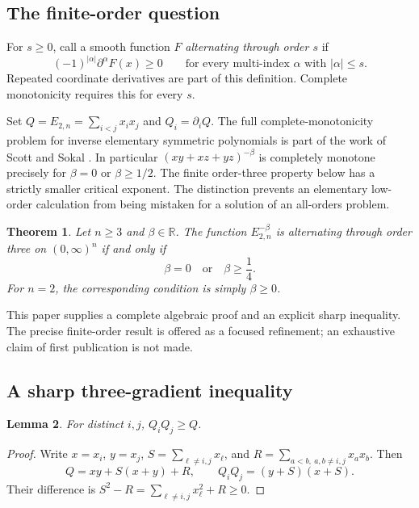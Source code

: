 \documentclass[11pt,a4paper]{article}
\newtheorem{theorem}{Theorem}[section]
\newtheorem{lemma}[theorem]{Lemma}
\theoremstyle{definition}\newtheorem{definition}[theorem]{Definition}
\theoremstyle{remark}\newtheorem{remark}[theorem]{Remark}
\newcommand{\R}{\mathbb R}\newcommand{\C}{\mathbb C}\newcommand{\N}{\mathbb N}
\numberwithin{equation}{section}
\begin{document}
\subsection{The finite-order question}\label{S04-sec-1}
For $s\ge0$, call a smooth function $F$ \emph{alternating through order $s$} if
\[
 (-1)^{|\alpha|}\partial^\alpha F(x)\ge0
 \qquad\text{for every multi-index $\alpha$ with }|\alpha|\le s.
\]
Repeated coordinate derivatives are part of this definition. Complete monotonicity requires this for every $s$.

Set $Q=E_{2,n}=\sum_{i<j}x_ix_j$ and $Q_i=\partial_iQ$. The full complete-monotonicity problem for inverse elementary symmetric polynomials is part of the work of Scott and Sokal \cite{ref005}. In particular $(xy+xz+yz)^{-\beta}$ is completely monotone precisely for $\beta=0$ or $\beta\ge1/2$. The finite order-three property below has a strictly smaller critical exponent. The distinction prevents an elementary low-order calculation from being mistaken for a solution of an all-orders problem.

\begin{theorem}\label{S04-thm:main}
Let $n\ge3$ and $\beta\in\R$. The function $E_{2,n}^{-\beta}$ is alternating through order three on $(0,\infty)^n$ if and only if
\[
 \beta=0\quad\text{or}\quad\beta\ge\frac14.
\]
For $n=2$, the corresponding condition is simply $\beta\ge0$.
\end{theorem}

This paper supplies a complete algebraic proof and an explicit sharp inequality. The precise finite-order result is offered as a focused refinement; an exhaustive claim of first publication is not made.

\subsection{A sharp three-gradient inequality}\label{S04-sec-2}
\begin{lemma}\label{S04-lem:pair}
For distinct $i,j$, $Q_iQ_j\ge Q$.
\end{lemma}
\begin{proof}
Write $x=x_i$, $y=x_j$, $S=\sum_{\ell\ne i,j}x_\ell$, and $R=\sum_{a<b,\ a,b\ne i,j}x_ax_b$. Then
\[
 Q=xy+S(x+y)+R,\qquad Q_iQ_j=(y+S)(x+S).
\]
Their difference is $S^2-R=\sum_{\ell\ne i,j}x_\ell^2+R\ge0$.
\end{proof}
\end{document}
